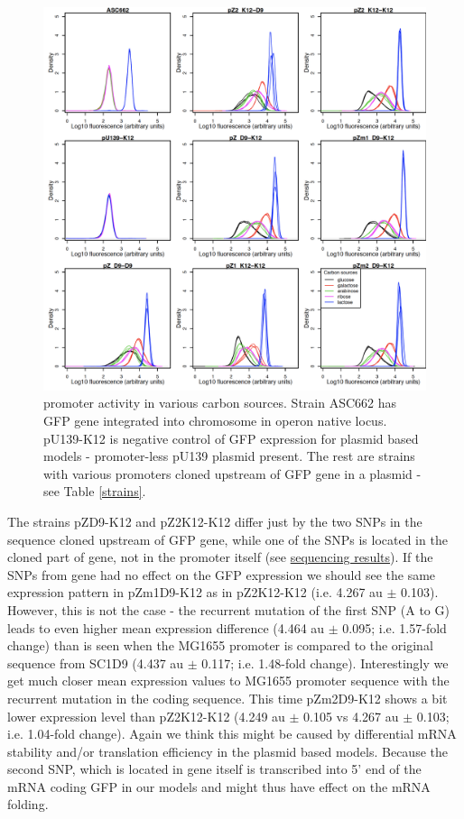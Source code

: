 \begin{figure}[ht!]
  \centering
  \includegraphics[scale=0.4]{text/Pictures/lacZassay.png}
	\caption{ promoter activity in various carbon sources. Strain ASC662 has GFP gene integrated into chromosome in  operon native locus. pU139-K12 is negative control of GFP expression for plasmid based models - promoter-less pU139 plasmid present. The rest are strains with various  promoters cloned upstream of GFP gene in a plasmid - see Table \ref{strains}.}
	\label{lacZassay}
\end{figure}

The strains pZ\textunderscore D9-K12 and pZ2\textunderscore K12-K12 differ just by the two SNPs in the sequence cloned upstream of GFP gene, while one of the SNPs is located in the cloned part of  gene, not in the promoter itself (see \hyperlink{SeqRes}{sequencing results}).
If the SNPs from  gene had no effect on the GFP expression we should see the same expression pattern in pZm1\textunderscore D9-K12 as in pZ2\textunderscore K12-K12 (i.e. 4.267 au $\pm$ 0.103).
However, this is not the case - the recurrent mutation of the first SNP (A to G) leads to even higher mean expression difference (4.464 au $\pm$ 0.095; i.e. 1.57-fold change) than is seen when the MG1655 promoter is compared to the original sequence from SC1\textunderscore D9 (4.437 au $\pm$ 0.117; i.e. 1.48-fold change).
Interestingly we get much closer mean expression values to MG1655 promoter sequence with the recurrent mutation in the  coding sequence.
This time pZm2\textunderscore D9-K12 shows a bit lower expression level than pZ2\textunderscore K12-K12 (4.249 au $\pm$ 0.105 vs 4.267 au $\pm$ 0.103; i.e. 1.04-fold change).
Again we think this might be caused by differential mRNA stability and/or translation efficiency in the plasmid based models.
Because the second SNP, which is located in  gene itself is transcribed into 5' end of the mRNA coding GFP in our models and might thus have effect on the mRNA folding.

